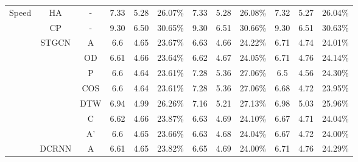 \begin{table}[t!]
\begin{center}
{\begin{tabular}{c|c|c|ccc|ccc|ccc}
                \multirow{23}{*}{Speed}          & HA                     & -                       & 7.33       & 5.28      & 26.07\%     & 7.33      & 5.28      & 26.08\%     & 7.32       & 5.27       & 26.04\%     \\
                                                 & CP                     & -                       & 9.30       & 6.50      & 30.65\%     & 9.30      & 6.51      & 30.66\%     & 9.30       & 6.51       & 30.63\%     \\
                \cline{2-12}
                                                 & \multirow{7}{*}{STGCN} & A                       & 6.6        & 4.65      & 23.67\%     & 6.63      & 4.66      & 24.22\%     & 6.71       & 4.74       & 24.01\%     \\
                                                 &                        & OD                      & 6.61       & 4.66      & 23.64\%     & 6.62      & 4.67      & 24.05\%     & 6.71       & 4.76       & 24.14\%     \\
                                                 &                        & P                       & 6.6        & 4.64      & 23.61\%     & 7.28      & 5.36      & 27.06\%     & 6.5        & 4.56       & 24.30\%     \\
                                                 &                        & COS                     & 6.6        & 4.64      & 23.61\%     & 7.28      & 5.36      & 27.06\%     & 6.68       & 4.72       & 23.95\%     \\
                                                 &                        & DTW                     & 6.94       & 4.99      & 26.26\%     & 7.16      & 5.21      & 27.13\%     & 6.98       & 5.03       & 25.96\%     \\
                                                 &                        & C                       & 6.62       & 4.66      & 23.87\%     & 6.63      & 4.69      & 24.10\%     & 6.67       & 4.71       & 24.04\%     \\
                                                 &                        & A'                      & 6.6        & 4.65      & 23.66\%     & 6.63      & 4.68      & 24.04\%     & 6.67       & 4.72       & 24.00\%     \\
                \cline{2-12}
                                                 & \multirow{7}{*}{DCRNN} & A                       & 6.61       & 4.65      & 23.82\%     & 6.65      & 4.69      & 24.00\%     & 6.71       & 4.76       & 24.29\%     \\

\end{tabular}}
\end{center}
\end{table}
